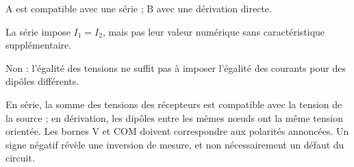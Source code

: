\par\noindent\begin{minipage}{\linewidth}
\label{cor-defi-15}\begin{questions}
\item A est compatible avec une série ; B avec une dérivation directe.
\item La série impose $I_1=I_2$, mais pas leur valeur numérique sans caractéristique supplémentaire.
\item Non : l’égalité des tensions ne suffit pas à imposer l’égalité des courants pour des dipôles différents.
\end{questions}
\end{minipage}
\par\noindent\begin{minipage}{\linewidth}
\label{cor-activite-15}
En série, la somme des tensions des récepteurs est compatible avec la tension de la source ; en dérivation, les dipôles entre les mêmes nœuds ont la même tension orientée. Les bornes V et COM doivent correspondre aux polarités annoncées. Un signe négatif révèle une inversion de mesure, et non nécessairement un défaut du circuit.\par\end{minipage}
